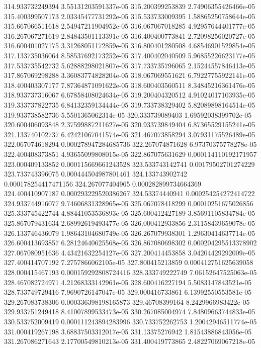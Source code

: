 {314.933732249394 3.55131203591337e-05
315.200399253839 2.74906355426466e-05
315.400399507173 2.03345477731292e-05
315.533733009395 1.58865250758644e-05
315.667066511618 2.54947211904952e-05
316.067067018285 4.92957644401777e-05
316.267067271619 2.84843501113391e-05
316.400400773841 2.72098256020727e-05
316.600401027175 3.31268051172859e-05
316.800401280508 4.68546901529854e-05
317.133735036064 8.58537692173252e-05
317.400402040509 5.96855226623177e-05
317.533735542732 5.62888298021807e-05
317.733735796065 2.15244557846413e-05
317.867069298288 3.36083774828204e-05
318.067069551621 6.79227755922141e-05
318.400403307177 7.87364871091622e-05
318.600403560511 8.34845216361476e-05
318.933737316067 6.67858408024634e-05
319.200404320512 4.91024017103935e-05
319.333737822735 6.84132359134444e-05
319.733738329402 5.82089898164514e-05
319.933738582736 5.5501365062314e-05
320.333739089403 1.69592038399702e-05
320.600406093848 2.37599887211627e-05
320.933739849404 6.87365529155241e-05
321.133740102737 6.42421067041574e-05
321.467073858294 3.07931175526489e-05
322.067074618294 0.000278947284685736
322.267074871628 6.97370375778278e-05
322.400408373851 4.93655099808015e-05
322.867075631629 0.000114110192171957
323.000409133852 0.000115669661243528
323.533743142741 0.00179502701274229
323.733743396075 0.000444504987801461
324.133743902742 0.000178254417471156
324.267077404965 0.000282899734664369
324.400410907187 0.000293229520386267
324.53374440941 0.000254254272414722
324.933744916077 9.74606831328965e-05
325.067078418299 0.00010251675026856
325.333745422744 4.88441053536893e-05
325.600412427189 3.85691105834784e-05
325.867079431634 2.68992619493477e-05
326.000412933856 2.31158439659078e-05
326.133746436079 1.98643104680749e-05
326.267079938301 1.29630414637714e-05
326.600413693857 6.28124640625568e-05
326.867080698302 0.000204295513378902
327.067080951636 4.43421632254127e-05
327.200414453858 3.04204429292009e-05
327.400414707192 7.2757866062105e-05
327.800415213859 0.000412751625639058
328.000415467193 0.000159292808724416
328.333749222749 7.06152647525063e-05
328.467082724971 4.21268333142961e-05
328.600416227194 5.5083147843521e-05
328.733749729416 7.9690726147047e-05
329.000416733861 6.13992550553581e-05
329.267083738306 0.000336398198165873
329.46708399164 8.2429966983422e-05
329.933751249418 8.41007899533473e-05
330.267085004974 7.84809663744833e-05
330.533752009419 0.000111243894283996
330.733752262753 1.20042946511774e-05
331.000419267198 3.68837503312017e-05
331.13375276942 1.81543886843056e-05
331.267086271643 2.17700549810213e-05
331.400419773865 2.48227069067218e-05
}
